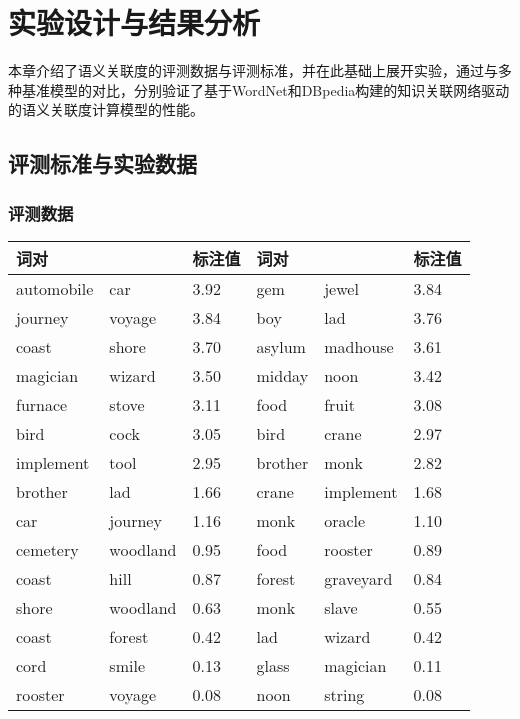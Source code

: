 \chapter{实验设计与结果分析}
\label{chap:chap05}

本章介绍了语义关联度的评测数据与评测标准，并在此基础上展开实验，通过与多种基准模型的对比，分别验证了基于WordNet和DBpedia构建的知识关联网络驱动的语义关联度计算模型的性能。

\section{评测标准与实验数据}
\subsection{评测数据}

\begin{table*}[htbp]
    \center
    \vspace{5pt}
    \begin{tabular}{p{2cm}p{2cm}p{1.4cm}p{2cm}p{2cm}p{1.4cm}}
    \hline
    \multicolumn{2}{l}{词对}     & 标注值          & \multicolumn{2}{l}{词对}     & 标注值  \\ \hline
    automobile    &    car    &    3.92 & gem    &    jewel    &    3.84  \\ \hline 
    journey    &    voyage    &    3.84 & boy    &    lad    &    3.76  \\ \hline 
    coast    &    shore    &    3.70 & asylum    &    madhouse    &    3.61  \\ \hline 
    magician    &    wizard    &    3.50 & midday    &    noon    &    3.42  \\ \hline 
    furnace    &    stove    &    3.11 & food    &    fruit    &    3.08  \\ \hline 
    bird    &    cock    &    3.05 & bird    &    crane    &    2.97  \\ \hline 
    implement    &    tool    &    2.95 & brother    &    monk    &    2.82  \\ \hline 
    brother    &    lad    &    1.66 & crane    &    implement    &    1.68  \\ \hline 
    car    &    journey    &    1.16 & monk    &    oracle    &    1.10  \\ \hline 
    cemetery    &    woodland    &    0.95 & food    &    rooster    &    0.89  \\ \hline 
    coast    &    hill    &    0.87 & forest    &    graveyard    &    0.84  \\ \hline 
    shore    &    woodland    &    0.63 & monk    &    slave    &    0.55  \\ \hline 
    coast    &    forest    &    0.42 & lad    &    wizard    &    0.42  \\ \hline 
    cord    &    smile    &    0.13 & glass    &    magician    &    0.11  \\ \hline 
    rooster    &    voyage    &    0.08 & noon    &    string    &    0.08  \\ \hline 
    \end{tabular}
    \label{mc30}
\end{table*}

